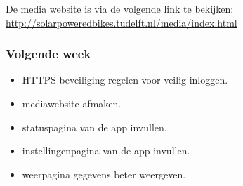 \noindent De media website is via de volgende link te bekijken:\\
\url{http://solarpoweredbikes.tudelft.nl/media/index.html}\\

\subsubsection*{Volgende week}
\begin{itemize}
\item HTTPS beveiliging regelen voor veilig inloggen.
\item mediawebsite afmaken.
\item statuspagina van de app invullen.
\item instellingenpagina van de app invullen.
\item weerpagina gegevens beter weergeven.

\end{itemize}
